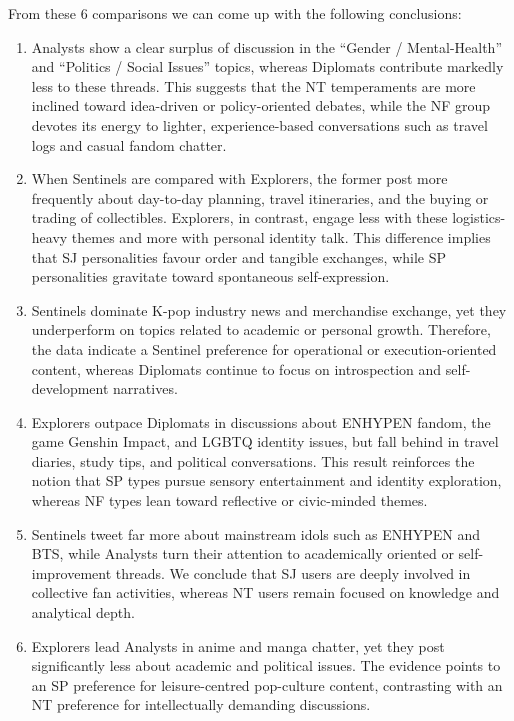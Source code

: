 \documentclass[12pt]{article}
\numberwithin{figure}{section}  %
\begin{document}
	From these 6 comparisons we can come up with the following conclusions:
	\begin{enumerate}
	\item Analysts show a clear surplus of discussion in the “Gender /
	Mental-Health” and “Politics / Social Issues” topics, whereas Diplomats
	contribute markedly less to these threads. This suggests that the NT
	temperaments are more inclined toward idea-driven or policy-oriented
	debates, while the NF group devotes its energy to lighter, experience-based
	conversations such as travel logs and casual fandom chatter.
	\item When Sentinels are compared with Explorers, the former post more
	frequently about day-to-day planning, travel itineraries, and the buying or
	trading of collectibles. Explorers, in contrast, engage less with these
	logistics-heavy themes and more with personal identity talk. This difference
	implies that SJ personalities favour order and tangible exchanges, while SP
	personalities gravitate toward spontaneous self-expression.
	\item Sentinels dominate K-pop industry news and merchandise exchange, yet
	they underperform on topics related to academic or personal growth.
	Therefore, the data indicate a Sentinel preference for operational or
	execution-oriented content, whereas Diplomats continue to focus on
	introspection and self-development narratives.
	\item Explorers outpace Diplomats in discussions about ENHYPEN fandom, the
	game Genshin Impact, and LGBTQ identity issues, but fall behind in travel
	diaries, study tips, and political conversations. This result reinforces the
	notion that SP types pursue sensory entertainment and identity exploration,
	whereas NF types lean toward reflective or civic-minded themes.
	\item Sentinels tweet far more about mainstream idols such as ENHYPEN and
	BTS, while Analysts turn their attention to academically oriented or
	self-improvement threads. We conclude that SJ users are deeply involved in
	collective fan activities, whereas NT users remain focused on knowledge and
	analytical depth.
	\item Explorers lead Analysts in anime and manga chatter, yet they post
	significantly less about academic and political issues. The evidence points
	to an SP preference for leisure-centred pop-culture content, contrasting
	with an NT preference for intellectually demanding discussions.
	\end{enumerate}
	
\end{document}
